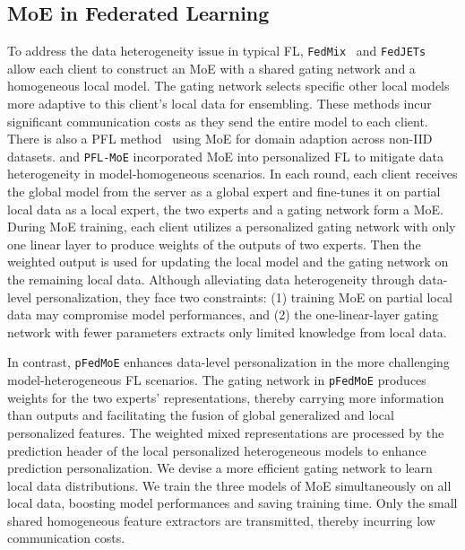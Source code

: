 \documentclass[sigconf]{acmart}
\newcommand{\hetero}{heterogeneous }
\newcommand{\homo}{homogeneous }
\newcommand{\pers}{personalized }
\newcommand{\gen}{generalized }
\newcommand{\methodname}{{\tt{pFedMoE}}}
\begin{document}
\subsection{MoE in Federated Learning}
To address the data heterogeneity issue in typical FL,
{\tt{FedMix}}~\citep{FedMix} and {\tt{FedJETs}}~\citep{FedJETs} allow each client to construct an MoE with a shared gating network and a homogeneous local model. The gating network selects specific other local models more adaptive to this client's local data for ensembling. These methods incur significant communication costs as they send the entire model to each client.
There is also a PFL method~\cite{xxl-moe} using MoE for domain adaption across non-IID datasets.
\citet{FL-MoE2} and {\tt{PFL-MoE}} \citep{PFL-MoE} incorporated MoE into \pers FL to mitigate data heterogeneity in model-\homo scenarios. In each round, each client receives the global model from the server as a global expert and fine-tunes it on partial local data as a local expert, the two experts and a gating network form a MoE. During MoE training, each client utilizes a \pers gating network with only one linear layer to produce weights of the outputs of two experts. Then the weighted output is used for updating the local model and the gating network on the remaining local data. 
Although alleviating data heterogeneity through data-level personalization, they face two constraints: (1) training MoE on partial local data may compromise model performances, and (2) the one-linear-layer gating network with fewer parameters extracts only limited knowledge from local data.



In contrast, \methodname{} enhances data-level personalization in the more challenging model-heterogeneous FL scenarios. The gating network in \methodname{} produces weights for the two experts' representations, thereby carrying more information than outputs and facilitating the fusion of global \gen and local \pers features. The weighted mixed representations are processed by the prediction header of the local \pers \hetero models to enhance prediction personalization. We devise a more efficient gating network to learn local data distributions. We train the three models of MoE simultaneously on all local data, boosting model performances and saving training time. Only the small shared \homo feature extractors are transmitted, thereby incurring low communication costs.
 
\end{document}
